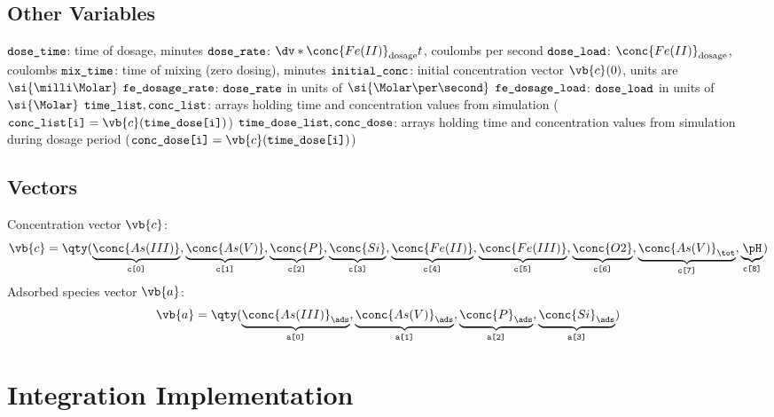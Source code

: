 \documentclass[11pt]{scrartcl} %
\begin{document}
        \subsection{Other Variables}
        \begin{multicols}{2}
            \begin{itemize}
                \ii $\verb|dose_time|$: time of dosage, minutes
                \ii $\verb|dose_rate|$: $\dv*{\conc{Fe (II)}_{\mathrm{dosage}}}{t}$, coulombs per second
                \ii $\verb|dose_load|$: $\conc{Fe (II)}_{\mathrm{dosage}}$, coulombs
                \ii $\verb|mix_time|$: time of mixing (zero dosing), minutes
                \ii $\verb|initial_conc|$: initial concentration vector $\vb{c}(0)$, units are $\si{\milli\Molar}$
                \ii $\verb|fe_dosage_rate|$: $\verb|dose_rate|$ in units of $\si{\Molar\per\second}$
                \ii $\verb|fe_dosage_load|$: $\verb|dose_load|$ in units of $\si{\Molar}$
                \ii $\verb|time_list|, \verb|conc_list|$: arrays holding time and concentration values from simulation ($\verb|conc_list[i]| = \vb{c}(\verb|time_dose[i]|)$)
                \ii $\verb|time_dose_list|, \verb|conc_dose|$: arrays holding time and concentration values from simulation during dosage period ($\verb|conc_dose[i]| = \vb{c}(\verb|time_dose[i]|)$)
        \end{itemize}
    \end{multicols}

    \subsection{Vectors}

    \begin{itemize}
        \ii Concentration vector $\vb{c}$:
        \[\vb{c} = \qty(\underbrace{\conc{As (III)}}_{\texttt{c[0]}}, \underbrace{\conc{As (V)}}_{\texttt{c[1]}}, \underbrace{\conc{P}}_{\texttt{c[2]}}, \underbrace{\conc{Si}}_{\texttt{c[3]}}, \underbrace{\conc{Fe (II)}}_{\texttt{c[4]}}, \underbrace{\conc{Fe (III)}}_{\texttt{c[5]}}, \underbrace{\conc{O2}}_{\texttt{c[6]}}, \underbrace{\conc{As (V)}_\tot}_{\texttt{c[7]}}, \underbrace{\pH}_{\texttt{c[8]}})\]
        \ii Adsorbed species vector $\vb{a}$:
        \[\vb{a} = \qty(\underbrace{\conc{As (III)}_\ads}_{\texttt{a[0]}}, \underbrace{\conc{As (V)}_\ads}_{\texttt{a[1]}}, \underbrace{\conc{P}_\ads}_{\texttt{a[2]}}, \underbrace{\conc{Si}_\ads}_{\texttt{a[3]}})\]
\end{itemize}
\section{Integration Implementation}
\end{document}
